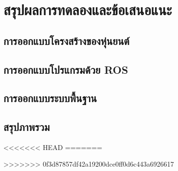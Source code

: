 
\chapter{สรุปผลการทดลองและข้อเสนอแนะ}

\section{การออกแบบโครงสร้างของหุ่นยนต์}


\section{การออกแบบโปรแกรมด้วย ROS}


\section{การออกแบบระบบพื้นฐาน}


\clearpage
\section{สรุปภาพรวม}
<<<<<<< HEAD
=======

>>>>>>> 0f3d87857df42a19200dce0ff0d6c443a6926617
